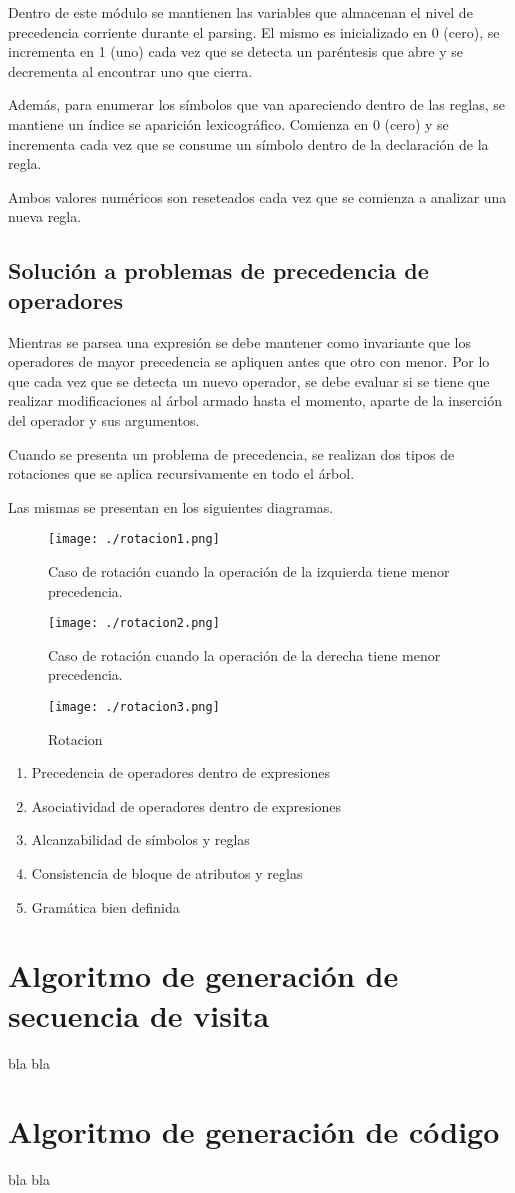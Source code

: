 Dentro de este módulo se mantienen las variables que almacenan el nivel de precedencia corriente durante el parsing. El mismo es inicializado en 0 (cero), se incrementa en 1 (uno) cada vez que se detecta un paréntesis que abre y se decrementa al encontrar uno que cierra.

Además, para enumerar los símbolos que van apareciendo dentro de las reglas, se mantiene un índice se aparición lexicográfico. Comienza en 0 (cero) y se incrementa cada vez que se consume un símbolo dentro de la declaración de la regla.

Ambos valores numéricos son reseteados cada vez que se comienza a analizar una nueva regla.

\subsection{Solución a problemas de precedencia de operadores}

Mientras se parsea una expresión se debe mantener como invariante que los operadores de mayor precedencia se apliquen antes que otro con menor. Por lo que cada vez que se detecta un nuevo operador, se debe evaluar si se tiene que realizar modificaciones al árbol armado hasta el momento, aparte de la inserción del operador y sus argumentos.

Cuando se presenta un problema de precedencia, se realizan dos tipos de rotaciones que se aplica recursivamente en todo el árbol.

Las mismas se presentan en los siguientes diagramas.

\begin{figure}\centering
\texttt{[image: ./rotacion1.png]}
\caption{\label{rotacion1} Caso de rotación cuando la operación de la izquierda tiene menor precedencia.}
\end{figure}

\begin{figure}\centering
\texttt{[image: ./rotacion2.png]}
\caption{\label{rotacion2} Caso de rotación cuando la operación de la derecha tiene menor precedencia.}
\end{figure}

\begin{figure}\centering
\texttt{[image: ./rotacion3.png]}
\caption{\label{rotacion3} Rotacion}
\end{figure}

\begin{enumerate}
\item Precedencia de operadores dentro de expresiones
\item Asociatividad de operadores dentro de expresiones
\item Alcanzabilidad de símbolos y reglas
\item Consistencia de bloque de atributos y reglas
\item Gramática bien definida
\end{enumerate}


\section{Algoritmo de generación de secuencia de visita}

bla bla
\section{Algoritmo de generación de código}
bla bla


\normalsize